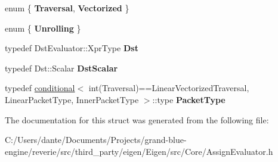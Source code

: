 \begin{DoxyCompactItemize}
enum \{ {\bfseries Traversal}, 
{\bfseries Vectorized}
 \}
\item 
\mbox{\label{struct_eigen_1_1internal_1_1copy__using__evaluator__traits_a3bc64cf4b25fc2966075c7274393ee74}} 
enum \{ {\bfseries Unrolling}
 \}
\item 
\mbox{\label{struct_eigen_1_1internal_1_1copy__using__evaluator__traits_a3f82645c1639690df8d7c786a86b6d76}} 
typedef Dst\+Evaluator\+::\+Xpr\+Type {\bfseries Dst}
\item 
\mbox{\label{struct_eigen_1_1internal_1_1copy__using__evaluator__traits_af449f8796c0ea6e750096672bad13525}} 
typedef Dst\+::\+Scalar {\bfseries Dst\+Scalar}
\item 
\mbox{\label{struct_eigen_1_1internal_1_1copy__using__evaluator__traits_acfc32ecb7201ba969f37e61c65e9b934}} 
typedef \mbox{\hyperlink{struct_eigen_1_1internal_1_1conditional}{conditional}}$<$ int(Traversal)==Linear\+Vectorized\+Traversal, Linear\+Packet\+Type, Inner\+Packet\+Type $>$\+::type {\bfseries Packet\+Type}
\end{DoxyCompactItemize}


The documentation for this struct was generated from the following file\+:\begin{DoxyCompactItemize}
\item 
C\+:/\+Users/dante/\+Documents/\+Projects/grand-\/blue-\/engine/reverie/src/third\+\_\+party/eigen/\+Eigen/src/\+Core/Assign\+Evaluator.\+h\end{DoxyCompactItemize}
